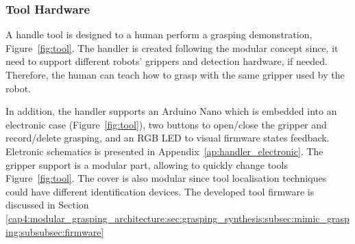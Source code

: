 










\subsubsection{Tool Hardware}
\label{cap4:modular_grasping_architecture:sec:grasping_synthesis:subsec:mimic_grasping:subsubsec:hardware}


A handle tool is designed to a human perform a grasping demonstration, Figure~\ref{fig:tool}. The handler is created following the modular concept since, it need to support different robots' grippers and detection hardware, if needed. Therefore, the human can teach how to grasp with the same gripper used by the robot.%

In addition, the handler supports an Arduino Nano which is embedded into an electronic case (Figure~\ref{fig:tool}), two buttons to open/close the gripper and record/delete grasping, and an RGB LED to visual firmware states feedback. Eletronic schematics is presented in Appendix~\ref{ap:handler_electronic}. The gripper support is a modular part, allowing to quickly change tools Figure~\ref{fig:tool}. The cover is also modular since tool localisation techniques could have different identification devices. The developed tool firmware is discussed in Section \ref{cap4:modular_grasping_architecture:sec:grasping_synthesis:subsec:mimic_grasping:subsubsec:firmware}

